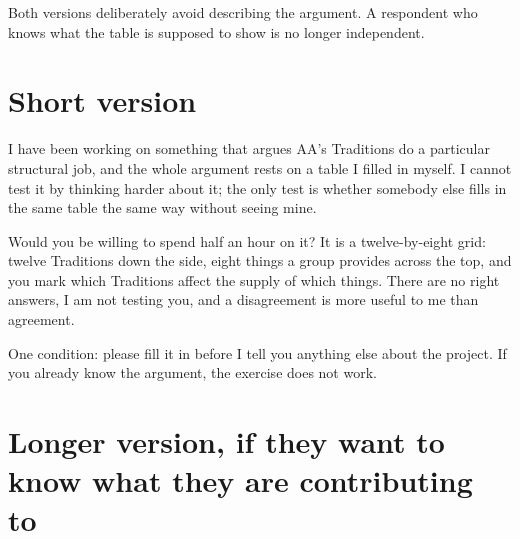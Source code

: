 \documentclass[11pt]{article}
\begin{document}

\begin{note}
Both versions deliberately avoid describing the argument. A respondent who knows what the table is
supposed to show is no longer independent.
\end{note}

\section{Short version}

\begin{note}
I have been working on something that argues AA's Traditions do a particular structural job, and
the whole argument rests on a table I filled in myself. I cannot test it by thinking harder about
it; the only test is whether somebody else fills in the same table the same way without seeing
mine.

\medskip
Would you be willing to spend half an hour on it? It is a twelve-by-eight grid: twelve Traditions
down the side, eight things a group provides across the top, and you mark which Traditions affect
the supply of which things. There are no right answers, I am not testing you, and a disagreement
is more useful to me than agreement.

\medskip
One condition: please fill it in before I tell you anything else about the project. If you already
know the argument, the exercise does not work.
\end{note}

\section{Longer version, if they want to know what they are contributing to}
\end{document}
